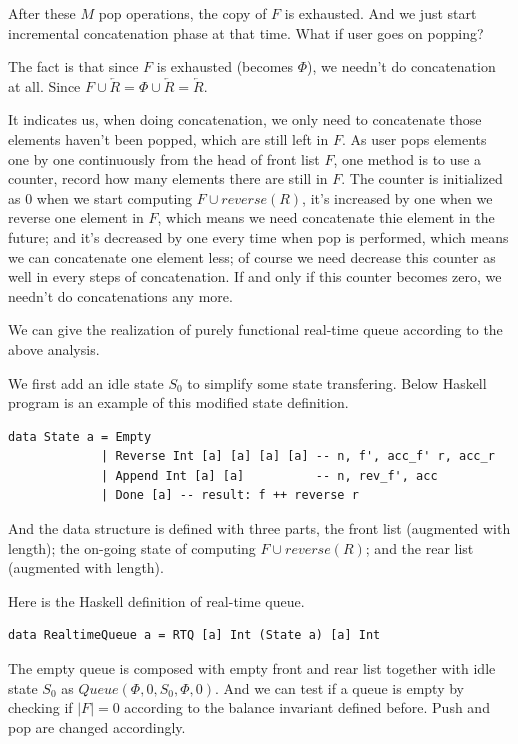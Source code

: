 \documentclass[UTF8]{article}
\begin{document}
After these $M$ pop operations, the copy of $F$ is exhausted. And we just
start incremental concatenation phase at that time. What if user goes
on popping?

The fact is that since $F$ is exhausted (becomes $\Phi$), we needn't do concatenation
at all. Since $F \cup \overleftarrow{R} = \Phi \cup \overleftarrow{R} = \overleftarrow{R}$.

It indicates us, when doing concatenation, we only need to concatenate those elements
haven't been popped, which are still left in $F$. As user pops elements one by one
continuously from the head of front list $F$, one method is to use a counter,
record how many elements there are still in $F$. The counter is initialized as 0
when we start computing $F \cup reverse(R)$, it's increased by one when we reverse
one element in $F$, which means we need concatenate thie element in the future;
and it's decreased by one every time when pop is
performed, which means we can concatenate one element less; of course we need decrease
this counter as well in every steps of concatenation. If and only if this counter
becomes zero, we needn't do concatenations any more.

We can give the realization of purely functional real-time queue according to the above
analysis.

We first add an idle state $S_0$ to simplify some state transfering. Below Haskell program
is an example of this modified state definition.

\lstset{language=Haskell}
\begin{lstlisting}
data State a = Empty
             | Reverse Int [a] [a] [a] [a] -- n, f', acc_f' r, acc_r
             | Append Int [a] [a]          -- n, rev_f', acc
             | Done [a] -- result: f ++ reverse r
\end{lstlisting}

And the data structure is defined with three parts, the front list (augmented with length);
the on-going state of computing $F \cup reverse(R)$; and the rear list (augmented with length).

Here is the Haskell definition of real-time queue.

\lstset{language=Haskell}
\begin{lstlisting}
data RealtimeQueue a = RTQ [a] Int (State a) [a] Int
\end{lstlisting}

The empty queue is composed with empty front and rear list together with idle state $S_0$ as
$Queue(\Phi, 0, S_0, \Phi, 0)$. And we can test if a queue is empty by checking if $|F| = 0$
according
to the balance invariant defined before. Push and pop are changed accordingly.
\end{document}

